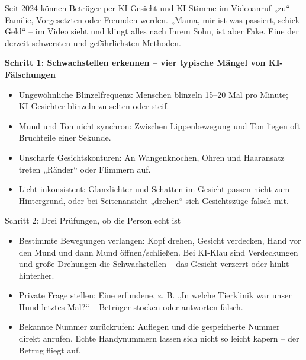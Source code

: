 Seit 2024 können Betrüger per KI-Gesicht und KI-Stimme im Videoanruf „zu“ Familie, Vorgesetzten oder Freunden werden. „Mama, mir ist was passiert, schick Geld“ – im Video sieht und klingt alles nach Ihrem Sohn, ist aber Fake. Eine der derzeit schwersten und gefährlichsten Methoden.

\textbf{Schritt 1: Schwachstellen erkennen – vier typische Mängel von KI-Fälschungen}\par

\begin{itemize}
  \item Ungewöhnliche Blinzelfrequenz: Menschen blinzeln 15–20 Mal pro Minute; KI-Gesichter blinzeln zu selten oder steif.
  \item Mund und Ton nicht synchron: Zwischen Lippenbewegung und Ton liegen oft Bruchteile einer Sekunde.
  \item Unscharfe Gesichtskonturen: An Wangenknochen, Ohren und Haaransatz treten „Ränder“ oder Flimmern auf.
  \item Licht inkonsistent: Glanzlichter und Schatten im Gesicht passen nicht zum Hintergrund, oder bei Seitenansicht „drehen“ sich Gesichtszüge falsch mit.
\end{itemize}

\begin{tcbinfo}{Schritt 2: Drei Prüfungen, ob die Person echt ist}
\begin{itemize}
  \item Bestimmte Bewegungen verlangen: Kopf drehen, Gesicht verdecken, Hand vor den Mund und dann Mund öffnen/schließen. Bei KI-Klau sind Verdeckungen und große Drehungen die Schwachstellen – das Gesicht verzerrt oder hinkt hinterher.
  \item Private Frage stellen: Eine erfundene, z. B. „In welche Tierklinik war unser Hund letztes Mal?“ – Betrüger stocken oder antworten falsch.
  \item Bekannte Nummer zurückrufen: Auflegen und die gespeicherte Nummer direkt anrufen. Echte Handynummern lassen sich nicht so leicht kapern – der Betrug fliegt auf.
\end{itemize}

\end{tcbinfo}

